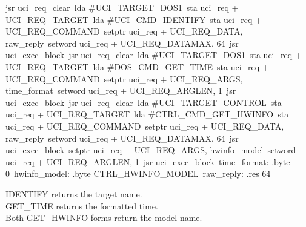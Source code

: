 \begin{listingbox}
\hspace*{2em}jsr uci\_req\_clear\
\hspace*{2em}lda \#UCI\_TARGET\_DOS1\
\hspace*{2em}sta uci\_req + UCI\_REQ\_TARGET\
\hspace*{2em}lda \#UCI\_CMD\_IDENTIFY\
\hspace*{2em}sta uci\_req + UCI\_REQ\_COMMAND\
\hspace*{2em}setptr uci\_req + UCI\_REQ\_DATA, raw\_reply\
\hspace*{2em}setword uci\_req + UCI\_REQ\_DATAMAX, 64\
\hspace*{2em}jsr uci\_exec\_block\
\hspace*{2em}jsr uci\_req\_clear\
\hspace*{2em}lda \#UCI\_TARGET\_DOS1\
\hspace*{2em}sta uci\_req + UCI\_REQ\_TARGET\
\hspace*{2em}lda \#DOS\_CMD\_GET\_TIME\
\hspace*{2em}sta uci\_req + UCI\_REQ\_COMMAND\
\hspace*{2em}setptr uci\_req + UCI\_REQ\_ARGS, time\_format\
\hspace*{2em}setword uci\_req + UCI\_REQ\_ARGLEN, 1\
\hspace*{2em}jsr uci\_exec\_block\
\hspace*{2em}jsr uci\_req\_clear\
\hspace*{2em}lda \#UCI\_TARGET\_CONTROL\
\hspace*{2em}sta uci\_req + UCI\_REQ\_TARGET\
\hspace*{2em}lda \#CTRL\_CMD\_GET\_HWINFO\
\hspace*{2em}sta uci\_req + UCI\_REQ\_COMMAND\
\hspace*{2em}setptr uci\_req + UCI\_REQ\_DATA, raw\_reply\
\hspace*{2em}setword uci\_req + UCI\_REQ\_DATAMAX, 64\
\hspace*{2em}jsr uci\_exec\_block\
\hspace*{2em}setptr uci\_req + UCI\_REQ\_ARGS, hwinfo\_model\
\hspace*{2em}setword uci\_req + UCI\_REQ\_ARGLEN, 1\
\hspace*{2em}jsr uci\_exec\_block\
time\_format: .byte 0\
hwinfo\_model: .byte CTRL\_HWINFO\_MODEL\
raw\_reply:   .res 64
\end{listingbox}

\begin{resultbox}
IDENTIFY returns the target name.\\
GET_TIME returns the formatted time.\\
Both GET_HWINFO forms return the model name.
\end{resultbox}

